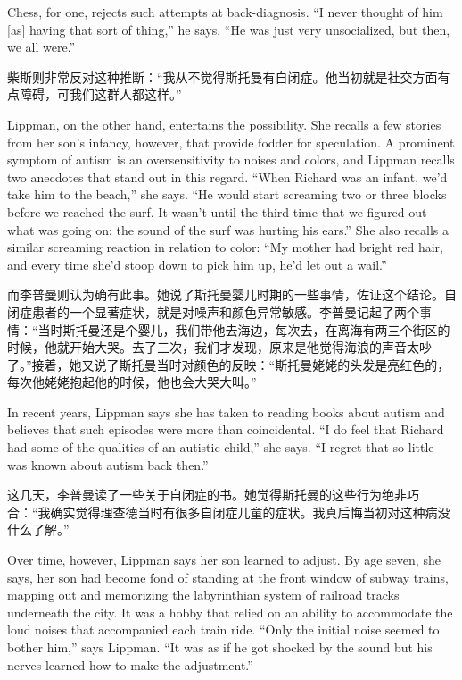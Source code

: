 \ifdefined\eng
Chess, for one, rejects such attempts at back-diagnosis. ``I never thought of him [as] having that sort of thing,'' he says. ``He was just very unsocialized, but then, we all were.''
\fi

\ifdefined\chs
柴斯则非常反对这种推断：``我从不觉得斯托曼有自闭症。他当初就是社交方面有点障碍，可我们这群人都这样。''
\fi

\ifdefined\eng
Lippman, on the other hand, entertains the possibility. She recalls a few stories from her son's infancy, however, that provide fodder for speculation. A prominent symptom of autism is an oversensitivity to noises and colors, and Lippman recalls two anecdotes that stand out in this regard. ``When Richard was an infant, we'd take him to the beach,'' she says. ``He would start screaming two or three blocks before we reached the surf. It wasn't until the third time that we figured out what was going on: the sound of the surf was hurting his ears.'' She also recalls a similar screaming reaction in relation to color: ``My mother had bright red hair, and every time she'd stoop down to pick him up, he'd let out a wail.''
\fi

\ifdefined\chs
而李普曼则认为确有此事。她说了斯托曼婴儿时期的一些事情，佐证这个结论。自闭症患者的一个显著症状，就是对噪声和颜色异常敏感。李普曼记起了两个事情：``当时斯托曼还是个婴儿，我们带他去海边，每次去，在离海有两三个街区的时候，他就开始大哭。去了三次，我们才发现，原来是他觉得海浪的声音太吵了。''接着，她又说了斯托曼当时对颜色的反映：``斯托曼姥姥的头发是亮红色的，每次他姥姥抱起他的时候，他也会大哭大叫。''
\fi

\ifdefined\eng
In recent years, Lippman says she has taken to reading books about autism and believes that such episodes were more than coincidental. ``I do feel that Richard had some of the qualities of an autistic child,'' she says. ``I regret that so little was known about autism back then.''
\fi

\ifdefined\chs
这几天，李普曼读了一些关于自闭症的书。她觉得斯托曼的这些行为绝非巧合：``我确实觉得理查德当时有很多自闭症儿童的症状。我真后悔当初对这种病没什么了解。''
\fi

\ifdefined\eng
Over time, however, Lippman says her son learned to adjust. By age seven, she says, her son had become fond of standing at the front window of subway trains, mapping out and memorizing the labyrinthian system of railroad tracks underneath the city. It was a hobby that relied on an ability to accommodate the loud noises that accompanied each train ride. ``Only the initial noise seemed to bother him,'' says Lippman. ``It was as if he got shocked by the sound but his nerves learned how to make the adjustment.''
\fi

